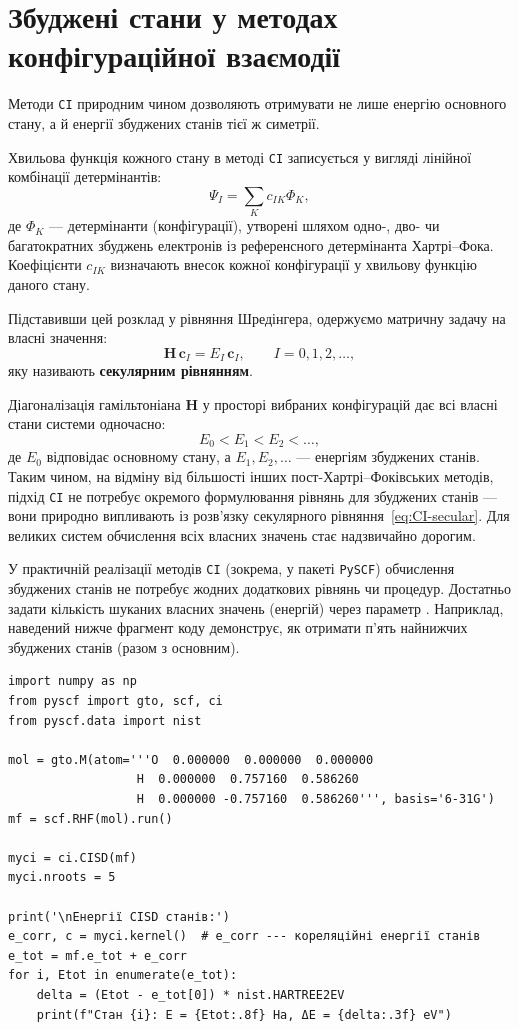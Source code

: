 \section{Збуджені стани у методах конфігураційної взаємодії}

Методи \texttt{CI} природним чином дозволяють отримувати не лише енергію основного стану, а й енергії збуджених станів тієї ж симетрії.

Хвильова функція кожного стану в методі \texttt{CI} записується у вигляді лінійної комбінації детермінантів:
\[
    \Psi_I = \sum_K c_{IK} \Phi_K,
\]
де $\Phi_K$ --- детермінанти (конфігурації), утворені шляхом одно-, дво- чи багатократних збуджень електронів із референсного детермінанта Хартрі–Фока.
Коефіцієнти $c_{IK}$ визначають внесок кожної конфігурації у хвильову функцію даного стану.

Підставивши цей розклад у рівняння Шредінгера, одержуємо матричну задачу на власні значення:
\begin{equation}\label{eq:CI-secular}
    \mathbf{H}\,\mathbf{c}_I = E_I\,\mathbf{c}_I, \qquad I = 0, 1, 2, \dots,
\end{equation}
яку називають \textbf{секулярним рівнянням}.

Діагоналізація гамільтоніана $\mathbf{H}$ у просторі вибраних конфігурацій дає всі власні стани системи одночасно:
\[
    E_0 < E_1 < E_2 < \dots,
\]
де $E_0$ відповідає основному стану, а $E_1, E_2, \dots$ --- енергіям збуджених станів.
Таким чином, на відміну від більшості інших пост-Хартрі–Фоківських методів, підхід \texttt{CI} не потребує окремого формулювання рівнянь для збуджених станів --- вони природно випливають із розв’язку секулярного рівняння~\eqref{eq:CI-secular}. Для великих систем обчислення всіх власних значень стає надзвичайно дорогим.

У практичній реалізації методів \texttt{CI} (зокрема, у пакеті \texttt{PySCF}) обчислення збуджених станів не потребує жодних додаткових рівнянь чи процедур.
Достатньо задати кількість шуканих власних значень (енергій) через параметр .
Наприклад, наведений нижче фрагмент коду демонструє, як отримати п’ять найнижчих   збуджених станів (разом з основним).


\begin{verbatim}
import numpy as np
from pyscf import gto, scf, ci
from pyscf.data import nist

mol = gto.M(atom='''O  0.000000  0.000000  0.000000
                  H  0.000000  0.757160  0.586260
                  H  0.000000 -0.757160  0.586260''', basis='6-31G')
mf = scf.RHF(mol).run()

myci = ci.CISD(mf)
myci.nroots = 5

print('\nЕнергії CISD станів:')
e_corr, c = myci.kernel()  # e_corr --- кореляційні енергії станів
e_tot = mf.e_tot + e_corr
for i, Etot in enumerate(e_tot):
    delta = (Etot - e_tot[0]) * nist.HARTREE2EV
    print(f"Стан {i}: E = {Etot:.8f} Ha, ΔE = {delta:.3f} eV")
\end{verbatim}

